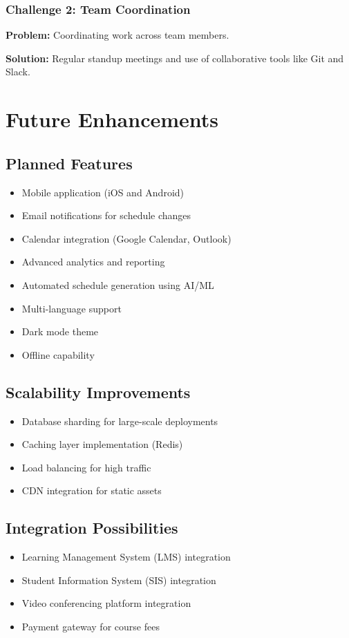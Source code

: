 \documentclass[12pt,a4paper]{report}
\begin{document}
\subsection{Challenge 2: Team Coordination}
\textbf{Problem:} Coordinating work across team members.

\textbf{Solution:} Regular standup meetings and use of collaborative tools like Git and Slack.

\chapter{Future Enhancements}

\section{Planned Features}
\begin{itemize}[leftmargin=*]
    \item Mobile application (iOS and Android)
    \item Email notifications for schedule changes
    \item Calendar integration (Google Calendar, Outlook)
    \item Advanced analytics and reporting
    \item Automated schedule generation using AI/ML
    \item Multi-language support
    \item Dark mode theme
    \item Offline capability
\end{itemize}

\section{Scalability Improvements}
\begin{itemize}[leftmargin=*]
    \item Database sharding for large-scale deployments
    \item Caching layer implementation (Redis)
    \item Load balancing for high traffic
    \item CDN integration for static assets
\end{itemize}

\section{Integration Possibilities}
\begin{itemize}[leftmargin=*]
    \item Learning Management System (LMS) integration
    \item Student Information System (SIS) integration
    \item Video conferencing platform integration
    \item Payment gateway for course fees
\end{itemize}
\end{document}
